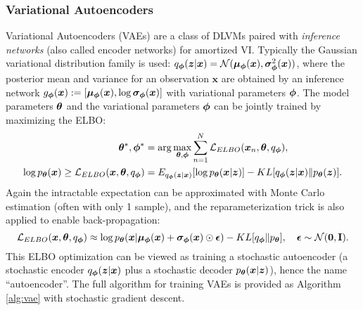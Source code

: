 \subsubsection{Variational Autoencoders}
Variational Autoencoders (VAEs) \citep{welling2014auto,rezende:vae2014} are a class of DLVMs paired with \emph{inference networks} (also called encoder networks) for amortized VI. Typically the Gaussian variational distribution family is used: $q_{\bm{\phi}}(\bm{z}|\bm{x})=\mathcal{N}(\bm{\mu}_{\bm{\phi}}(\bm{x}), \bm{\sigma}^2_{\bm{\phi}}(\bm{x}))$, where the posterior mean and variance for an observation $\bm{x}$ are obtained by an inference network $g_{\bm{\phi}}(\bm{x}) := [\bm{\mu}_{\bm{\phi}}(\bm{x}), \log \bm{\sigma}_{\bm{\phi}}(\bm{x})]$ with variational parameters $\bm{\phi}$.
%
The model parameters $\bm{\theta}$ and the variational parameters $\bm{\phi}$ can be jointly trained by maximizing the ELBO: 
\begin{equation}
\begin{aligned}
\bm{\theta}^*, \bm{\phi}^* &= \arg\max_{\bm{\theta}, \bm{\phi}} \sum_{n=1}^N \mathcal{L}_{ELBO}(\bm{x}_n, \bm{\theta}, q_{\bm{\phi}}), \\
\log p_{\bm{\theta}}(\bm{x}) \geq \mathcal{L}_{ELBO}(\bm{x}, \bm{\theta}, q_{\bm{\phi}}) &= E_{q_{\bm{\phi}}(\bm{z}|\bm{x})}[\log p_{\bm{\theta}}(\bm{x}|\bm{z})] - KL[q_{\bm{\phi}}(\bm{z}|\bm{x})\|p_{\bm{\theta}}(\bm{z})].
\end{aligned}
\label{eq:vae_objective}
\end{equation}
%
Again the intractable expectation can be approximated with Monte Carlo estimation (often with only 1 sample), and the reparameterization trick \citep{welling2014auto,rezende:vae2014} is also applied to enable back-propagation:
%
\begin{equation}
    \mathcal{L}_{ELBO}(\bm{x}, \bm{\theta}, q_{\bm{\phi}}) \approx \log p_{\bm{\theta}}(\bm{x}|\bm{\mu}_{\bm{\phi}}(\bm{x})+ \bm{\sigma}_{\bm{\phi}}(\bm{x}) \odot \bm{\epsilon}) - KL[q_{\bm{\phi}}\|p_{\bm{\theta}}], \quad \bm{\epsilon} \sim \mathcal{N}(\bm{0}, \mathbf{I}).
\label{eq:vae_objective_mc_reparam}
\end{equation}
%
This ELBO optimization can be viewed as training a stochastic autoencoder (a stochastic encoder $q_{\bm{\phi}}(\bm{z} | \bm{x})$ plus a stochastic decoder $p_{\bm{\theta}}(\bm{x} | \bm{z})$), hence the name ``autoencoder''. The full algorithm for training VAEs is provided as Algorithm \ref{alg:vae} with stochastic gradient descent.

